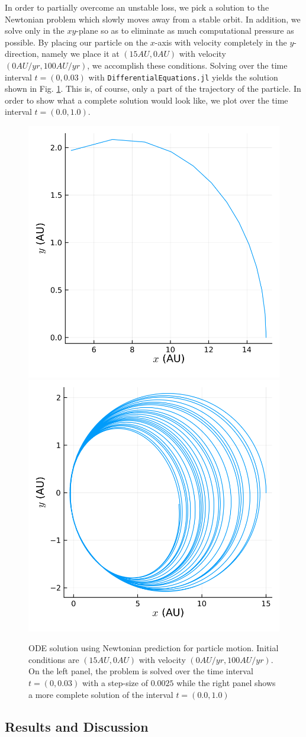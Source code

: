 \documentclass{CUP-JNL-DTM}%
\theoremstyle{definition}
\numberwithin{equation}{section}
\begin{document}
In order to partially overcome an unstable loss, we pick a solution to the Newtonian problem which slowly moves away from a stable orbit. In addition, we solve only in the $xy$-plane so as to eliminate as much computational pressure as possible. By placing our particle on the $x$-axis with velocity completely in the $y$-direction, namely we place it at $(15 \si{AU}, 0 \si{AU})$ with velocity $(0 \si{AU/yr}, 100 \si{AU/yr})$, we accomplish these conditions. Solving over the time interval $t = (0, 0.03)$ with \texttt{DifferentialEquations.jl} yields the solution shown in Fig. \ref{fig:newton_sol}. This is, of course, only a part of the trajectory of the particle. In order to show what a complete solution would look like, we plot over the time interval $t = (0.0, 1.0)$. 

\begin{figure}
    \centering
    \includegraphics[width=0.3\linewidth]{figures/newton_solution.png}
    \includegraphics[width=0.3\linewidth]{figures/newton_solution_complete.png}
    \caption{ODE solution using Newtonian prediction for particle motion. Initial conditions are $(15 \si{AU}, 0 \si{AU})$ with velocity $(0 \si{AU/yr}, 100 \si{AU/yr})$. On the left panel, the problem is solved over the time interval $t = (0, 0.03)$ with a step-size of $0.0025$ while the right panel shows a more complete solution of the interval $t = (0.0, 1.0)$}
    \label{fig:newton_sol}
\end{figure}

\subsection{Results and Discussion}
\end{document}
